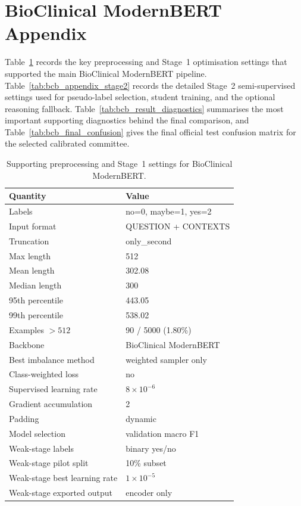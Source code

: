 \section{BioClinical ModernBERT Appendix}
\label{app:bcb_supporting_tables}

Table~\ref{tab:bcb_appendix_stage1} records the key preprocessing and Stage~1 optimisation settings that supported the main BioClinical ModernBERT pipeline. Table~\ref{tab:bcb_appendix_stage2} records the detailed Stage~2 semi-supervised settings used for pseudo-label selection, student training, and the optional reasoning fallback. Table~\ref{tab:bcb_result_diagnostics} summarises the most important supporting diagnostics behind the final comparison, and Table~\ref{tab:bcb_final_confusion} gives the final official test confusion matrix for the selected calibrated committee.

\FloatBarrier
\begin{table}[htbp]
\centering
\footnotesize
\setlength{\tabcolsep}{4pt}
\renewcommand{\arraystretch}{1.1}
\begin{tabularx}{\columnwidth}{|l|X|}
\hline
\textbf{Quantity} & \textbf{Value} \\
\hline
Labels & no=0, maybe=1, yes=2 \\
\hline
Input format & QUESTION + CONTEXTS \\
\hline
Truncation & only\_second \\
\hline
Max length & 512 \\
\hline
Mean length & 302.08 \\
\hline
Median length & 300 \\
\hline
95th percentile & 443.05 \\
\hline
99th percentile & 538.02 \\
\hline
Examples $>512$ & 90 / 5000 (1.80\%) \\
\hline
Backbone & BioClinical ModernBERT \\
\hline
Best imbalance method & weighted sampler only \\
\hline
Class-weighted loss & no \\
\hline
Supervised learning rate & $8\times10^{-6}$ \\
\hline
Gradient accumulation & 2 \\
\hline
Padding & dynamic \\
\hline
Model selection & validation macro F1 \\
\hline
Weak-stage labels & binary yes/no \\
\hline
Weak-stage pilot split & 10\% subset \\
\hline
Weak-stage best learning rate & $1\times10^{-5}$ \\
\hline
Weak-stage exported output & encoder only \\
\hline
\end{tabularx}
\caption{Supporting preprocessing and Stage~1 settings for BioClinical ModernBERT.}
\label{tab:bcb_appendix_stage1}
\end{table}
\FloatBarrier

